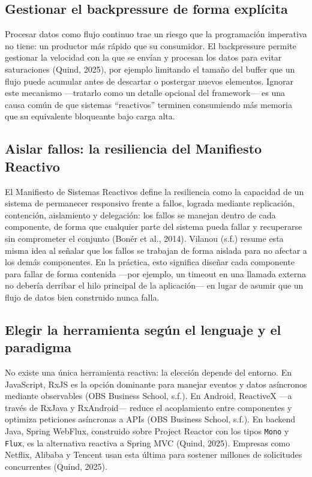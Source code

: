 \documentclass[
  spanish,
  12pt,
  letterpaper,
]{article}
\begin{document}
\subsection{Gestionar el backpressure de forma
explícita}\label{gestionar-el-backpressure-de-forma-expluxedcita}

Procesar datos como flujo continuo trae un riesgo que la programación
imperativa no tiene: un productor más rápido que su consumidor. El
backpressure permite gestionar la velocidad con la que se envían y
procesan los datos para evitar saturaciones (Quind, 2025), por ejemplo
limitando el tamaño del buffer que un flujo puede acumular antes de
descartar o postergar nuevos elementos. Ignorar este mecanismo
---tratarlo como un detalle opcional del framework--- es una causa común
de que sistemas ``reactivos'' terminen consumiendo más memoria que su
equivalente bloqueante bajo carga alta.

\subsection{Aislar fallos: la resiliencia del Manifiesto
Reactivo}\label{aislar-fallos-la-resiliencia-del-manifiesto-reactivo}

El Manifiesto de Sistemas Reactivos define la resiliencia como la
capacidad de un sistema de permanecer responsivo frente a fallos,
lograda mediante replicación, contención, aislamiento y delegación: los
fallos se manejan dentro de cada componente, de forma que cualquier
parte del sistema pueda fallar y recuperarse sin comprometer el conjunto
(Bonér et al., 2014). Vilanou (s.f.) resume esta misma idea al señalar
que los fallos se trabajan de forma aislada para no afectar a los demás
componentes. En la práctica, esto significa diseñar cada componente para
fallar de forma contenida ---por ejemplo, un timeout en una llamada
externa no debería derribar el hilo principal de la aplicación--- en
lugar de asumir que un flujo de datos bien construido nunca falla.

\subsection{Elegir la herramienta según el lenguaje y el
paradigma}\label{elegir-la-herramienta-seguxfan-el-lenguaje-y-el-paradigma}

No existe una única herramienta reactiva: la elección depende del
entorno. En JavaScript, RxJS es la opción dominante para manejar eventos
y datos asíncronos mediante observables (OBS Business School, s.f.). En
Android, ReactiveX ---a través de RxJava y RxAndroid--- reduce el
acoplamiento entre componentes y optimiza peticiones asíncronas a APIs
(OBS Business School, s.f.). En backend Java, Spring WebFlux, construido
sobre Project Reactor con los tipos \texttt{Mono} y \texttt{Flux}, es la
alternativa reactiva a Spring MVC (Quind, 2025). Empresas como Netflix,
Alibaba y Tencent usan esta última para sostener millones de solicitudes
concurrentes (Quind, 2025).
\end{document}
